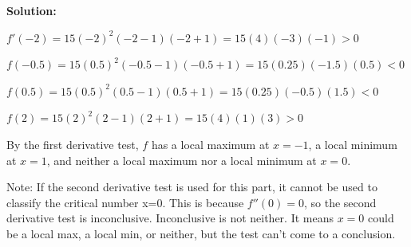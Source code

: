 \documentclass[11pt]{article}
\begin{document}
\begin{enumerate}
\begin{enumerate}
    {\color{blue}\textbf{Solution:}

    $f'(-2)=15(-2)^2(-2-1)(-2+1)=15(4)(-3)(-1)>0$
    
    $f(-0.5)=15(0.5)^2(-0.5-1)(-0.5+1)=15(0.25)(-1.5)(0.5)<0$
    
    $f(0.5)=15(0.5)^2(0.5-1)(0.5+1)=15(0.25)(-0.5)(1.5)<0$
    
    $f(2)=15(2)^2(2-1)(2+1)=15(4)(1)(3)>0$
    
    \begin{center}
    \end{center}
    
    By the first derivative test, $f$ has a local maximum at $x=-1$, a local minimum at $x=1$, and neither a local maximum nor a local minimum at $x=0$.}

    {\color{orange} Note: If the second derivative test is used for this part, it cannot be used to classify the critical number x=0. This is because $f''(0)=0$, so the second derivative test is inconclusive. Inconclusive is not neither. It means $x=0$ could be a local max, a local min, or neither, but the test can't come to a conclusion.}


\end{enumerate}
\end{enumerate}
\end{document}
